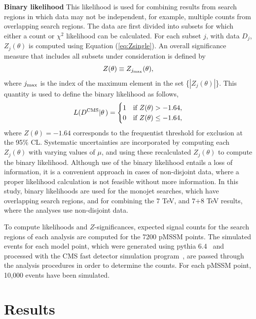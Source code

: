 \textbf{Binary likelihood}
This likelihood is used for combining results from search regions in
which data may not be independent, for example, multiple counts from
overlapping search regions.  The data are first divided into subsets for
which either a count or $\chi^2$ likelihood can be calculated.  For
each subset $j$, with data $D_j$, $Z_j(\theta)$ is computed using Equation 
(\ref{eq:Zsingle}).  An overall significance measure that includes all subsets under consideration is defined by
\begin{equation}
  Z(\theta) \equiv  Z_{j_{\rm max}}(\theta),
  \label{eq:Zmulti}
\end{equation}
where $j_{\rm max}$ is the index of the maximum element in the set \{$|Z_j(\theta)|$\}.
This quantity is used to define the binary likelihood as follows,
\begin{equation}
  L(D^{\text{CMS}}|\theta\,) =
  \begin{cases}
    1 & \text{if } Z(\theta) > -1.64, \\
    0 & \text{if } Z(\theta) \leq -1.64,
  \end{cases}
  \label{eq:lhd_binary}
\end{equation}
where $Z(\theta)=-1.64$ corresponds to the frequentist threshold for
exclusion at the 95\% CL. Systematic uncertainties are incorporated by computing each $Z_j(\theta)$ with varying  values of $\mu$, and using these recalculated $Z_j(\theta)$ to compute the binary likelihood.  
Although use of the binary likelihood entails a loss of information, it is a convenient approach in cases of non-disjoint data, where a proper likelihood calculation is not feasible without more information.  In this study, binary likelihoods are used for the monojet searches, which have overlapping search regions, and for combining the 7 TeV, and 7$+$8 TeV results, where the analyses use non-disjoint data.

To compute likelihoods and $Z$-significances,  expected signal counts for
the search regions of each analysis are computed
for the 7200 pMSSM points. The simulated events for each model point, which were generated using {\sc pythia} 6.4~\cite{Sjostrand:2006za} and processed with the CMS fast detector simulation program~\cite{Abdullin:2011zz}, are passed through the analysis procedures in order to determine the counts.  For each pMSSM point, 10,000 events have been simulated.  

\section{Results}
\label{sec:results}

